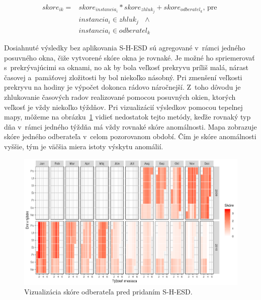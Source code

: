 \documentclass[a4paper,twoside,slovak,12pt,appendix]{article}
\begin{document}
\begin{equation}
  \begin{split}
    skore_{ik} = & skore_{instancia_i} * skore_{zhluk_j} + skore_{odberatel_k} \text{, pre } \\
    & instancia_i \in zhluk_j \text{ } \land \\
    & instancia_i \in odberatel_k
  \end{split}
  \label{eq:client-score}
\end{equation}

\noindent
Dosiahnuté výsledky bez aplikovania S-H-ESD sú agregované v~rámci jedného
posuvného okna, čiže vytvorené skóre okna je rovnaké. Je možné ho spriemerovať
s~prekrývajúcimi sa oknami, no ak by bola veľkosť prekryvu príliš malá, nárast
časovej a~pamäťovej zložitosti by bol niekoľko násobný. Pri zmenšení veľkosti
prekryvu na hodiny je výpočet dokonca rádovo náročnejší. Z~toho dôvodu je
zhlukovanie časových radov realizované pomocou posuvných okien, ktorých veľkosť
je vždy niekoľko týždňov. Pri vizualizácií výsledkov pomocou tepelnej mapy,
môžeme na obrázku~\ref{fig:heatmap-days} vidieť nedostatok tejto metódy, keďže
rovnaký typ dňa v~rámci jedného týždňa má vždy rovnaké skóre anomálnosti. Mapa
zobrazuje skóre jedného odberateľa v~celom pozorovanom období. Čím je skóre
anomálnosti vyššie, tým je väčšia miera istoty výskytu anomálií.

\begin{figure}[htbp]
  \centering
  \includegraphics[width=\textwidth]{heatmap_days.png}
  \caption{Vizualizácia skóre odberateľa pred pridaním S-H-ESD.}
  \label{fig:heatmap-days}
\end{figure}
\end{document}
